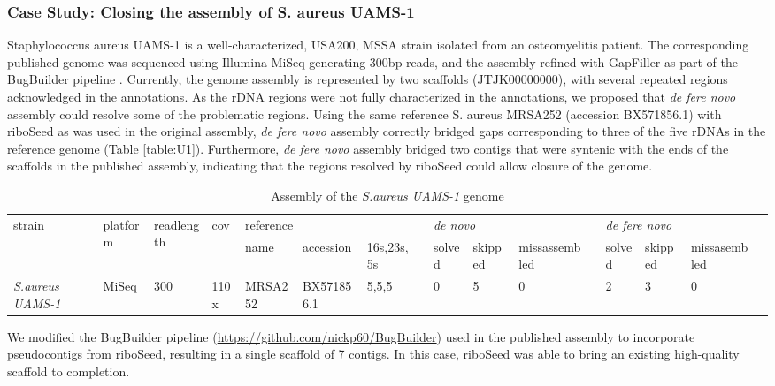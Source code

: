 \documentclass[10pt]{article}
\makeatletter
\newcommand{\ra}[1]{\renewcommand{\arraystretch}{#1}}
\newcommand{\cmidrules}[1]{%
  \noalign{%
    \global\MD@cmidrules={}%
    \toks@={\cmidrule(l{.3\tabcolsep}r{.3\tabcolsep})}%
    \count@=\z@
    \loop\ifnum\count@<#1\relax
      \advance\count@\@ne
      \edef\MD@temp{\the\toks@{\the\count@-\the\count@}}%
      \global\MD@cmidrules\expandafter{\the\expandafter\MD@cmidrules\MD@temp}%
    \repeat
  }%
  \the\MD@cmidrules
}
\makeatother
\begin{document}
\begin{linenumbers}
\subsubsection*{Case Study: Closing the assembly of S. aureus UAMS-1}
Staphylococcus aureus UAMS-1 is a well-characterized, USA200, MSSA strain isolated from an osteomyelitis patient. The corresponding published genome was sequenced using Illumina MiSeq generating 300bp reads, and the assembly refined with GapFiller as part of the BugBuilder pipeline \cite{Abbott2017}. Currently, the genome assembly is represented by two scaffolds (JTJK00000000), with several repeated regions acknowledged in the annotations\cite{Sassi2015}. As the rDNA regions were not fully characterized in the annotations, we proposed that \textit{de fere novo} assembly could resolve some of the problematic regions. Using the same reference S. aureus MRSA252\cite{Holden2004} (accession BX571856.1) with riboSeed as was used in the original assembly, \textit{de fere novo} assembly correctly bridged gaps corresponding to three of the five rDNAs in the reference genome (Table \ref{table:U1}). Furthermore, \textit{de fere novo} assembly bridged two contigs that were syntenic with the ends of the scaffolds in the published assembly, indicating that the regions resolved by riboSeed could allow closure of the genome.

\begin{table}[]
  \centering
  \ra{1.3}
  \caption{Assembly of the \textit{S.aureus UAMS-1} genome}
  \label{U1}
  \begin{tabular}{llllllllllllllll}
    \toprule
    \multirow{2}{*}{strain} & \multirow{2}{*}{platform} & \multirow{2}{*}{readlength} & \multirow{2}{*}{cov} & \multicolumn{3}{l}{reference} &  & \multicolumn{3}{l}{\textit{de novo}} &  & \multicolumn{3}{l}{\textit{de fere novo}} &  \\
    \cline{5-7} \cline{9-11} \cline{13-15} &  &  &  & name & accession & 16s,23s,5s &  & solved & skipped & missassembled &  & solved & skipped & missasembled &  \\
    \cmidrules{16}
    \textit{S.aureus UAMS-1} & MiSeq & 300 & 110x & MRSA252 & BX571856.1 & 5,5,5 &  & 0 & 5 & 0 &  & 2 & 3 & 0 & \\
    \bottomrule

  \end{tabular}
\end{table}


We modified the BugBuilder pipeline (\url{https://github.com/nickp60/BugBuilder}) used in the published assembly to incorporate pseudocontigs from riboSeed, resulting in a single scaffold of 7 contigs. In this case, riboSeed was able to bring an existing high-quality scaffold to completion.


\end{linenumbers}
\end{document}
